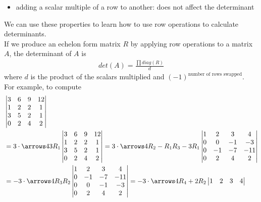 \begin{itemize}
\begin{itemize}
      \item adding a scalar multiple of a row to another: does not affect the determinant
    \end{itemize}
    We can use these properties to learn how to use row operations to calculate determinants.\\
    If we produce an echelon form matrix $R$ by applying row operations to a matrix $A$, the determinant of $A$ is
    \begin{align*}
      det(A) = \frac{\prod diag(R)}{d}
    \end{align*}
    where $d$ is the product of the scalars multiplied and $(-1)^{\text{number of rows swapped}}$.\\
    For example, to compute
    \begin{align*}
      &\begin{vmatrix}
        3 & 6 & 9 & 12\\
        1 & 2 & 2 & 1\\
        3 & 5 & 2 & 1\\
        0 & 2 & 4 & 2
      \end{vmatrix}
      \\
      &= 3 \cdot
      \arrows4{3R_1}{}{}{}
      \begin{vmatrix}
        3 & 6 & 9 & 12\\
        1 & 2 & 2 & 1\\
        3 & 5 & 2 & 1\\
        0 & 2 & 4 & 2
      \end{vmatrix}
      =
      3 \cdot
      \arrows4{}{R_2 - R_1}{R_3 - 3R_1}{}
      \begin{vmatrix}
        1 & 2 & 3 & 4\\
        0 & 0 & -1 & -3\\
        0 & -1 & -7 & -11\\
        0 & 2 & 4 & 2
      \end{vmatrix}
      \\
      &=
      -3 \cdot
      \arrows4{}{R_3}{R_2}{}
      \begin{vmatrix}
        1 & 2 & 3 & 4\\
        0 & -1 & -7 & -11\\
        0 & 0 & -1 & -3\\
        0 & 2 & 4 & 2
      \end{vmatrix}
      =
      -3 \cdot
      \arrows4{}{}{}{R_4 + 2R_2}
      \begin{vmatrix}
        1 & 2 & 3 & 4\\

\end{vmatrix}
\end{align*}
\end{itemize}
